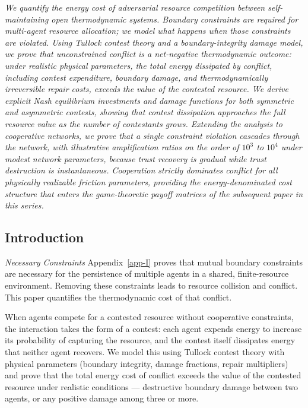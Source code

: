 \documentclass[11pt]{article}
\theoremstyle{plain}
\theoremstyle{definition}
\theoremstyle{remark}
\let\origsubsection\subsection
\renewcommand{\subsection}{\needspace{7\baselineskip}\origsubsection}
\begin{document}
\emph{We quantify the energy cost of adversarial resource competition
between self-maintaining open thermodynamic systems. Boundary
constraints are required for multi-agent resource allocation; we model
what happens when those constraints are violated. Using Tullock contest
theory and a boundary-integrity damage model, we prove that
unconstrained conflict is a net-negative thermodynamic outcome: under
realistic physical parameters, the total energy dissipated by conflict,
including contest expenditure, boundary damage, and thermodynamically
irreversible repair costs, exceeds the value of the contested resource.
We derive explicit Nash equilibrium investments and damage functions for
both symmetric and asymmetric contests, showing that contest dissipation
approaches the full resource value as the number of contestants grows.
Extending the analysis to cooperative networks, we prove that a single
constraint violation cascades through the network, with illustrative
amplification ratios on the order of \(10^3\) to \(10^4\) under modest
network parameters, because trust recovery is gradual while trust
destruction is instantaneous. Cooperation strictly dominates conflict
for all physically realizable friction parameters, providing the
energy-denominated cost structure that enters the game-theoretic payoff
matrices of the subsequent paper in this series.}

\subsection{Introduction}\label{introduction-4}

\emph{Necessary Constraints} Appendix~\ref{app-I} proves that mutual
boundary constraints are necessary for the persistence of multiple
agents in a shared, finite-resource environment. Removing these
constraints leads to resource collision and conflict. This paper
quantifies the thermodynamic cost of that conflict.

When agents compete for a contested resource without cooperative
constraints, the interaction takes the form of a contest: each agent
expends energy to increase its probability of capturing the resource,
and the contest itself dissipates energy that neither agent recovers. We
model this using Tullock contest theory \citep{Tullock1980} with
physical parameters (boundary integrity, damage fractions, repair
multipliers) and prove that the total energy cost of conflict exceeds
the value of the contested resource under realistic conditions ---
destructive boundary damage between two agents, or any positive damage
among three or more.
\end{document}

